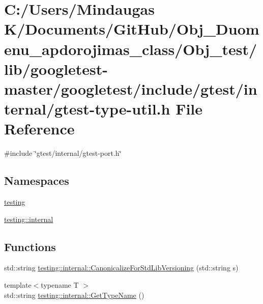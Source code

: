 \hypertarget{_obj__test_2lib_2googletest-master_2googletest_2include_2gtest_2internal_2gtest-type-util_8h}{}\section{C\+:/\+Users/\+Mindaugas K/\+Documents/\+Git\+Hub/\+Obj\+\_\+\+Duomenu\+\_\+apdorojimas\+\_\+class/\+Obj\+\_\+test/lib/googletest-\/master/googletest/include/gtest/internal/gtest-\/type-\/util.h File Reference}
\label{_obj__test_2lib_2googletest-master_2googletest_2include_2gtest_2internal_2gtest-type-util_8h}
{\ttfamily \#include \char`\"{}gtest/internal/gtest-\/port.\+h\char`\"{}}\newline
\subsection*{Namespaces}
\begin{DoxyCompactItemize}
\item 
 \mbox{\hyperlink{namespacetesting}{testing}}
\item 
 \mbox{\hyperlink{namespacetesting_1_1internal}{testing\+::internal}}
\end{DoxyCompactItemize}
\subsection*{Functions}
\begin{DoxyCompactItemize}
\item 
std\+::string \mbox{\hyperlink{namespacetesting_1_1internal_a5342e843f087081705094beae07b557b}{testing\+::internal\+::\+Canonicalize\+For\+Std\+Lib\+Versioning}} (std\+::string s)
\item 
{\footnotesize template$<$typename T $>$ }\\std\+::string \mbox{\hyperlink{namespacetesting_1_1internal_a635606b4731f843c86ec8ca51cab83a1}{testing\+::internal\+::\+Get\+Type\+Name}} ()
\end{DoxyCompactItemize}
